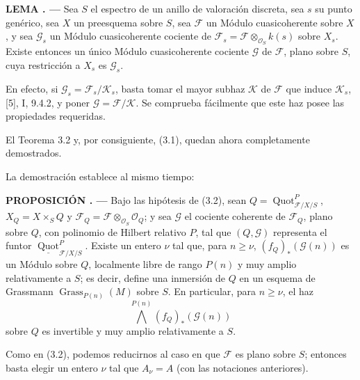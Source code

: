 \documentclass[11pt,twoside,openany]{book}
\numberwithin{equation}{section}
\newcommand{\src}[1]{%
  \phantomsection\hypertarget{src:#1}{}%
  \marginpar{\raggedleft\footnotesize\sffamily #1}%
}
\theoremstyle{plain}
\theoremstyle{definition}
\theoremstyle{remark}
\newcommand{\result}[2]{%
  \par\medskip\noindent\textbf{#1%
  \if\relax\detokenize{#2}\relax\else\space#2\fi. ---}\enspace
}
\newcommand{\FgaUnitKey}{frontmatter}
\renewcommand{\src}[1]{%
  \phantomsection\hypertarget{src:\FgaUnitKey:#1}{}%
  \marginpar{\raggedleft\footnotesize\sffamily #1}%
}
\theoremstyle{plain}
\theoremstyle{definition}
\theoremstyle{remark}
\begin{document}
\result{LEMA}{3.7} Sea $S$ el espectro de un anillo de valoración discreta,
sea $s$ su punto genérico, sea $X$ un preesquema sobre $S$, sea $\mathcal F$
un Módulo cuasicoherente sobre $X$, y sea $\mathcal G_s$ un Módulo
cuasicoherente cociente de
$\mathcal F_s=\mathcal F\otimes_{\mathcal O_S}k(s)$ sobre $X_s$. Existe
entonces un único Módulo cuasicoherente cociente $\mathcal G$ de $\mathcal F$,
plano sobre $S$, cuya restricción a $X_s$ es $\mathcal G_s$.
\src{265}
En efecto, si $\mathcal G_s=\mathcal F_s/\mathcal K_s$, basta tomar el mayor
subhaz $\mathcal K$ de $\mathcal F$ que induce $\mathcal K_s$, [5], I, 9.4.2,
y poner $\mathcal G=\mathcal F/\mathcal K$. Se comprueba fácilmente que este
haz posee las propiedades requeridas.

El Teorema 3.2 y, por consiguiente, (3.1), quedan ahora completamente
demostrados.

La demostración establece al mismo tiempo:

\result{PROPOSICIÓN}{3.8} Bajo las hipótesis de (3.2), sean
$Q=\operatorname{Quot}^P_{\mathcal F/X/S}$, $X_Q=X\times_SQ$ y
$\mathcal F_Q=\mathcal F\otimes_{\mathcal O_S}\mathcal O_Q$; y sea
$\mathcal G$ el cociente coherente de $\mathcal F_Q$, plano sobre $Q$, con
polinomio de Hilbert relativo $P$, tal que $(Q,\mathcal G)$ representa el
funtor $\underline{\operatorname{Quot}}^P_{\mathcal F/X/S}$. Existe un entero
$\nu$ tal que, para $n\geq\nu$, $(f_Q)_*(\mathcal G(n))$ es un Módulo sobre
$Q$, localmente libre de rango $P(n)$ y muy amplio relativamente a $S$; es
decir, define una inmersión de $Q$ en un esquema de Grassmann
$\operatorname{Grass}_{P(n)}(M)$ sobre $S$. En particular, para $n\geq\nu$,
el haz
\[
\bigwedge^{P(n)}(f_Q)_*(\mathcal G(n))
\]
sobre $Q$ es invertible y muy amplio relativamente a $S$.

Como en (3.2), podemos reducirnos al caso en que $\mathcal F$ es plano sobre
$S$; entonces basta elegir un entero $\nu$ tal que $A_\nu=A$ (con las
notaciones anteriores).
\end{document}
